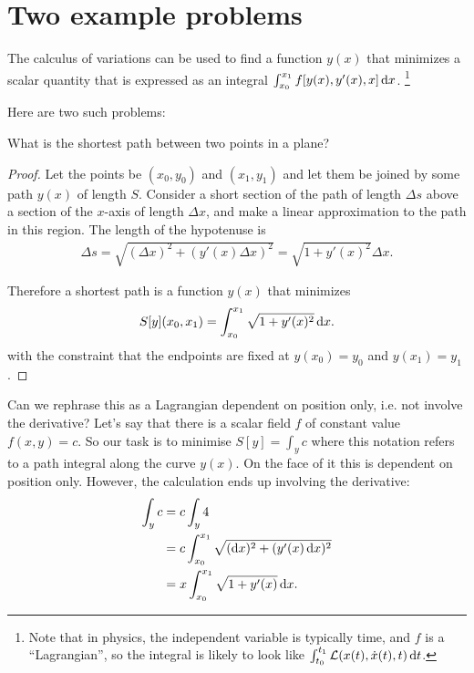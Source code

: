 
\section{Two example problems}
The calculus of variations can be used to find a function $y(x)$ that minimizes a scalar quantity that is
expressed as an integral $\int_{x_0}^{x_1} f[y(x), y'(x), x] \dx$. \footnote{Note that in physics, the
  independent variable is typically time, and $f$ is a ``Lagrangian'', so the integral is likely to look
  like $\int_{t_0}^{t_1} \Lag(x(t), \xdot(t), t) \dt$.}

Here are two such problems:

\begin{question*}
  What is the shortest path between two points in a plane?
\end{question*}

\begin{proof}
  Let the points be $(x_0, y_0)$ and $(x_1, y_1)$ and let them be joined by some path $y(x)$ of length $S$.
  Consider a short section of the path of length $\Delta s$ above a section of the $x$-axis of
  length $\Delta x$, and make a linear approximation to the path in this region. The length of the hypotenuse
  is
  \begin{align*}
    \Delta s = \sqrt{(\Delta x)^2 + (y'(x)\Delta x)^2} = \sqrt{1 + y'(x)^2} \Delta x.
  \end{align*}

  Therefore a shortest path is a function $y(x)$ that minimizes
  \begin{align*}
    S[y](x_0, x_1) = \int_{x_0}^{x_1} \sqrt{1 + y'(x)^2}\dx.
  \end{align*}
  with the constraint that the endpoints are fixed at $y(x_0) = y_0$ and $y(x_1) = y_1$.

\end{proof}


Can we rephrase  this as a Lagrangian  dependent on position only,  i.e. not involve the  derivative? Let's say
that   there  is   a  scalar   field  $f$   of  constant   value   $f(x,  y)   =  c$.   So  our   task  is   to
minimise $S[y] = \int_{y} c$ where this notation refers to  a path integral along the curve $y(x)$. On the face
of it this is dependent on position only. However, the calculation ends up involving the derivative:
\begin{align*}
  \int_{y} c
  &= c\int_{y}4 \\
  &= c\int_{x_{0}}^{x_{1}}\sqrt{(\dx)^{2} + (y'(x)\dx)^{2}} \\
  &= x\int_{x_0}^{x_1} \sqrt{1 + y'(x)} \dx.
\end{align*}

